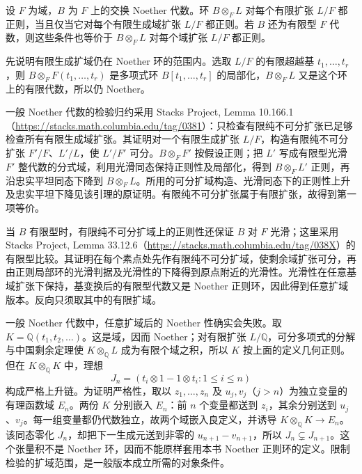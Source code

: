 \begin{proposition}[几何正则性的扩域检验]\label{b3:prop:geometric-regular-field-tests}
	设 \(F\) 为域，\(B\) 为 \(F\) 上的交换 Noether 代数。环 \(B\otimes_FL\) 对每个有限扩张 \(L/F\) 都正则，当且仅当它对每个有限生成域扩张 \(L/F\) 都正则。若 \(B\) 还为有限型 \(F\) 代数，则这些条件也等价于 \(B\otimes_FL\) 对每个域扩张 \(L/F\) 都正则。
\end{proposition}
\begin{proofsketch}
	先说明有限生成扩域仍在 Noether 环的范围内。选取 \(L/F\) 的有限超越基 \(t_1,\ldots,t_r\)，则 \(B\otimes_FF(t_1,\ldots,t_r)\) 是多项式环 \(B[t_1,\ldots,t_r]\) 的局部化，\(B\otimes_FL\) 又是这个环上的有限代数，所以仍 Noether。

	一般 Noether 代数的检验归约采用 Stacks Project, Lemma 10.166.1（\url{https://stacks.math.columbia.edu/tag/0381}）：只检查有限纯不可分扩张已足够检查所有有限生成域扩张。其证明对一个有限生成扩张 \(L/F\)，构造有限纯不可分扩张 \(F'/F\)、\(L'/L\)，使 \(L'/F'\) 可分。\(B\otimes_FF'\) 按假设正则；把 \(L'\) 写成有限型光滑 \(F'\) 整代数的分式域，利用光滑同态保持正则性及局部化，得到 \(B\otimes_FL'\) 正则，再沿忠实平坦同态下降到 \(B\otimes_FL\)。所用的可分扩域构造、光滑同态下的正则性上升及忠实平坦下降见该引理的原证明。有限纯不可分扩张属于有限扩张，故得到第一项等价。

	当 \(B\) 有限型时，有限纯不可分扩域上的正则性还保证 \(B\) 对 \(F\) 光滑；这里采用 Stacks Project, Lemma 33.12.6（\url{https://stacks.math.columbia.edu/tag/038X}）的有限型比较。其证明在每个素点处先作有限纯不可分扩域，使剩余域扩张可分，再由正则局部环的光滑判据及光滑性的下降得到原点附近的光滑性。光滑性在任意基域扩张下保持，基变换后的有限型代数又是 Noether 正则环，因此得到任意扩域版本。反向只须取其中的有限扩域。
\end{proofsketch}

一般 Noether 代数中，任意扩域后的 Noether 性确实会失败。取 \(K=\mathbb Q(t_1,t_2,\ldots)\)。这是域，因而 Noether；对有限扩张 \(L/\mathbb Q\)，可分多项式的分解与中国剩余定理使 \(K\otimes_{\mathbb Q}L\) 成为有限个域之积，所以 \(K\) 按上面的定义几何正则。但在 \(K\otimes_{\mathbb Q}K\) 中，理想
\[
	J_n=(t_i\otimes1-1\otimes t_i:1\le i\le n)
\]
构成严格上升链。为证明严格性，取以 \(z_1,\ldots,z_n\) 及 \(u_j,v_j\)（\(j>n\)）为独立变量的有理函数域 \(E_n\)。两份 \(K\) 分别嵌入 \(E_n\)：前 \(n\) 个变量都送到 \(z_i\)，其余分别送到 \(u_j\)、\(v_j\)。每一组变量都仍代数独立，故两个域嵌入良定义，并诱导 \(K\otimes_{\mathbb Q}K\to E_n\)。该同态零化 \(J_n\)，却把下一生成元送到非零的 \(u_{n+1}-v_{n+1}\)，所以 \(J_n\subsetneq J_{n+1}\)。这个张量积不是 Noether 环，因而不能原样套用本书 Noether 正则环的定义。限制检验的扩域范围，是一般版本成立所需的对象条件。
